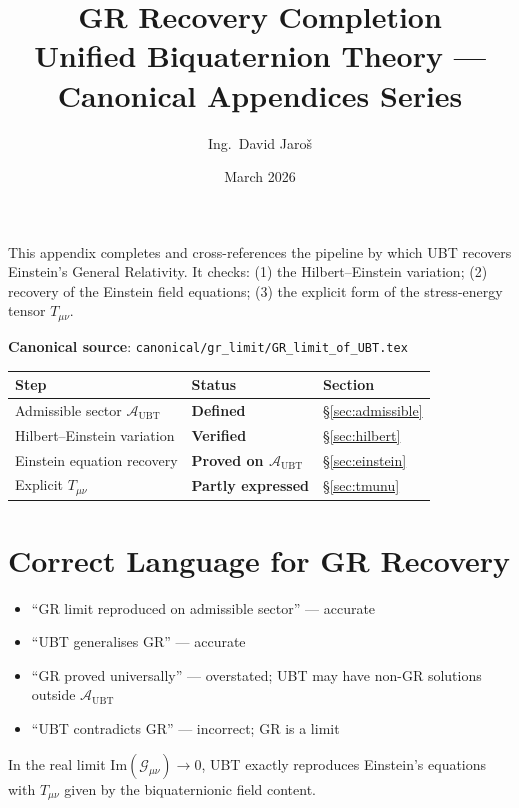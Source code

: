\documentclass[11pt,a4paper]{article}
\title{\textbf{GR Recovery Completion}\\
\large Unified Biquaternion Theory — Canonical Appendices Series}
\author{Ing.\ David Jaroš}
\date{March 2026}
\theoremstyle{definition}
\theoremstyle{remark}
\begin{document}
\maketitle
\tableofcontents
\bigskip

\begin{tcolorbox}[colback=blue!4!white,colframe=blue!50!black,title=Purpose]
This appendix completes and cross-references the pipeline by which
UBT recovers Einstein's General Relativity.  It checks: (1) the
Hilbert--Einstein variation; (2) recovery of the Einstein field equations;
(3) the explicit form of the stress-energy tensor $T_{\mu\nu}$.

\medskip
\textbf{Canonical source}:
\texttt{canonical/gr\_limit/GR\_limit\_of\_UBT.tex}

\medskip
\begin{tabular}{lll}
\hline
Step & Status & Section \\
\hline
Admissible sector $\mathcal{A}_{\mathrm{UBT}}$ & \textbf{Defined} & \S\ref{sec:admissible} \\
Hilbert--Einstein variation & \textbf{Verified} & \S\ref{sec:hilbert} \\
Einstein equation recovery & \textbf{Proved on $\mathcal{A}_{\mathrm{UBT}}$} & \S\ref{sec:einstein} \\
Explicit $T_{\mu\nu}$ & \textbf{Partly expressed} & \S\ref{sec:tmunu} \\
\hline
\end{tabular}
\end{tcolorbox}

\section{Correct Language for GR Recovery}\label{sec:language}

\begin{tcolorbox}[colback=green!4!white,colframe=green!50!black,title=Canonical language]
\begin{itemize}
  \item[$\checkmark$] ``GR limit reproduced on admissible sector'' — accurate
  \item[$\checkmark$] ``UBT generalises GR'' — accurate
  \item[$\times$] ``GR proved universally'' — overstated; UBT may have
    non-GR solutions outside $\mathcal{A}_{\mathrm{UBT}}$
  \item[$\times$] ``UBT contradicts GR'' — incorrect; GR is a limit
\end{itemize}
In the real limit $\mathrm{Im}(\mathcal{G}_{\mu\nu}) \to 0$, UBT exactly
reproduces Einstein's equations with $T_{\mu\nu}$ given by the
biquaternionic field content.
\end{tcolorbox}
\end{document}
